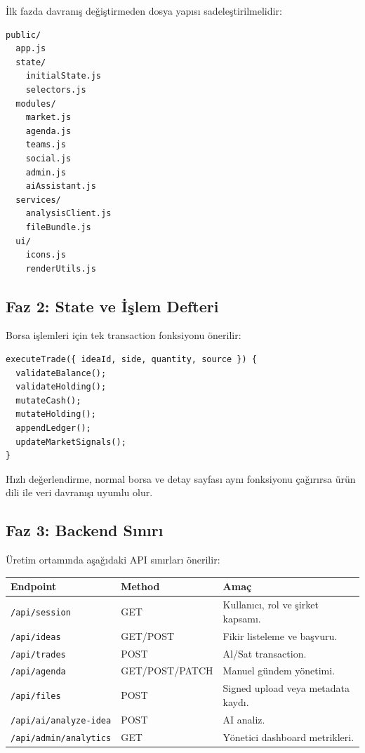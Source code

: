 \documentclass[11pt,a4paper]{article}
\newcommand{\code}[1]{\texttt{#1}}
\begin{document}
İlk fazda davranış değiştirmeden dosya yapısı sadeleştirilmelidir:

\begin{lstlisting}
public/
  app.js
  state/
    initialState.js
    selectors.js
  modules/
    market.js
    agenda.js
    teams.js
    social.js
    admin.js
    aiAssistant.js
  services/
    analysisClient.js
    fileBundle.js
  ui/
    icons.js
    renderUtils.js
\end{lstlisting}

\subsection{Faz 2: State ve İşlem Defteri}

Borsa işlemleri için tek transaction fonksiyonu önerilir:

\begin{lstlisting}
executeTrade({ ideaId, side, quantity, source }) {
  validateBalance();
  validateHolding();
  mutateCash();
  mutateHolding();
  appendLedger();
  updateMarketSignals();
}
\end{lstlisting}

Hızlı değerlendirme, normal borsa ve detay sayfası aynı fonksiyonu çağırırsa ürün dili ile veri davranışı uyumlu olur.

\subsection{Faz 3: Backend Sınırı}

Üretim ortamında aşağıdaki API sınırları önerilir:

\begin{longtable}{p{}p{}p{}}
\toprule
\textbf{Endpoint} & \textbf{Method} & \textbf{Amaç}\\
\midrule
\code{/api/session} & GET & Kullanıcı, rol ve şirket kapsamı.\\
\code{/api/ideas} & GET/POST & Fikir listeleme ve başvuru.\\
\code{/api/trades} & POST & Al/Sat transaction.\\
\code{/api/agenda} & GET/POST/PATCH & Manuel gündem yönetimi.\\
\code{/api/files} & POST & Signed upload veya metadata kaydı.\\
\code{/api/ai/analyze-idea} & POST & AI analiz.\\
\code{/api/admin/analytics} & GET & Yönetici dashboard metrikleri.\\
\bottomrule
\end{longtable}
\end{document}
